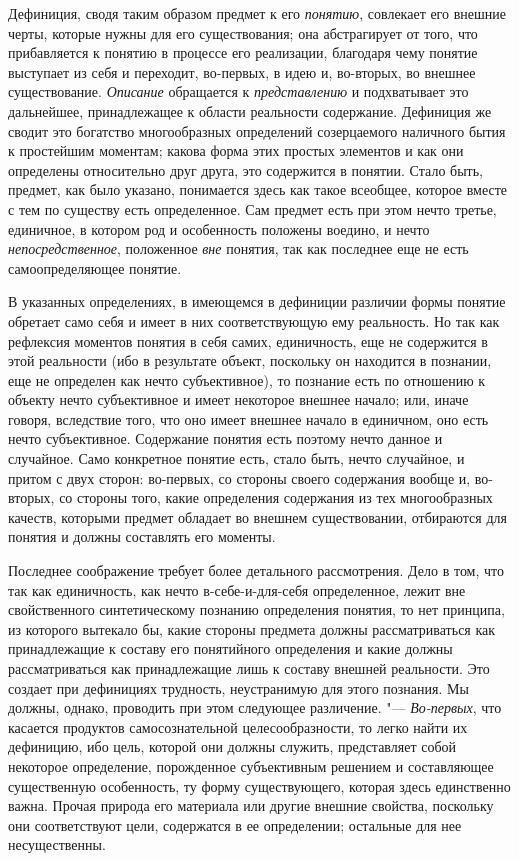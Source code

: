{{Дефиниция, сводя таким образом предмет к его
{\em понятию}, совлекает
его внешние черты, которые нужны для его существования; она абстрагирует от
того, что прибавляется к понятию в процессе его реализации, благодаря чему
понятие выступает из себя и переходит, во-первых, в идею и, во-вторых, во
внешнее существование. {\em Описание}
обращается к
{\em представлению} и
подхватывает это дальнейшее, принадлежащее к области реальности содержание.
Дефиниция же сводит это богатство многообразных определений созерцаемого
наличного бытия к простейшим моментам; какова форма этих простых элементов
и как они определены относительно друг друга, это содержится в понятии.
Стало быть, предмет, как было указано, понимается здесь как такое всеобщее,
которое вместе с тем по существу есть определенное. Сам предмет есть при
этом нечто третье, единичное, в котором род и особенность
положены воедино, и нечто
{\em непосредственное},
положенное {\em вне}
понятия, так как последнее еще не есть самоопределяющее
понятие.

В указанных определениях, в имеющемся в дефиниции различии
формы понятие обретает само себя и имеет в них соответствующую ему
реальность. Но так как рефлексия моментов понятия в себя самих,
единичность, еще не содержится в этой реальности (ибо в результате объект,
поскольку он находится в познании, еще не определен как нечто
субъективное), то познание есть по отношению к объекту нечто субъективное и
имеет некоторое внешнее начало; или, иначе говоря, вследствие того, что оно
имеет внешнее начало в единичном, оно есть нечто субъективное. Содержание
понятия есть поэтому нечто данное и случайное. Само конкретное понятие
есть, стало быть, нечто случайное, и притом с двух сторон: во-первых, со
стороны своего содержания вообще и, во-вторых, со стороны того, какие
определения содержания из тех многообразных качеств, которыми предмет
обладает во внешнем существовании, отбираются для понятия и должны
составлять его моменты.

Последнее соображение требует более детального рассмотрения.
Дело в том, что так как единичность, как нечто
в-себе-и-для-себя определенное, лежит вне свойственного
синтетическому познанию определения понятия, то нет принципа, из которого
вытекало бы, какие стороны предмета должны рассматриваться как
принадлежащие к составу его понятийного определения и какие должны
рассматриваться как принадлежащие лишь к составу внешней реальности. Это
создает при дефинициях трудность, неустранимую для этого познания. Мы
должны, однако, проводить при этом следующее различение. "---
{\em Во-первых}, что
касается продуктов самосознательной целесообразности, то легко найти их
дефиницию, ибо цель, которой они должны служить, представляет собой
некоторое определение, порожденное субъективным решением и составляющее
существенную особенность, ту форму существующего, которая здесь единственно
важна. Прочая природа его материала или другие внешние свойства, поскольку
они соответствуют цели, содержатся в ее определении; остальные для нее
несущественны.

}}

